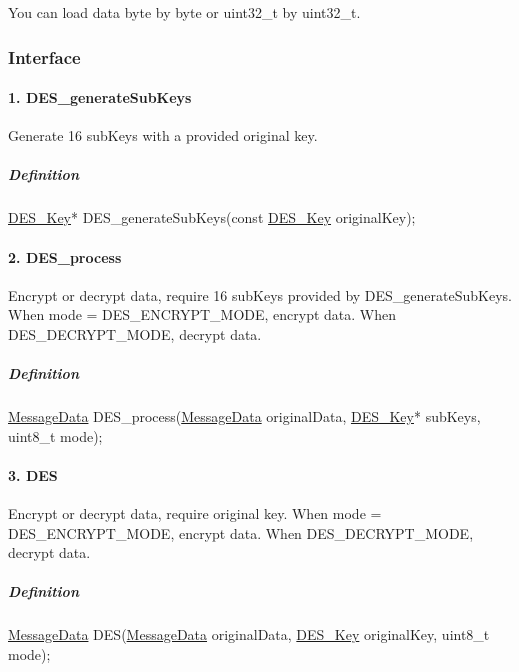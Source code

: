 You can load data byte by byte or uint32\+\_\+t by uint32\+\_\+t.

\subsubsection*{Interface}

\paragraph*{1. D\+E\+S\+\_\+generate\+Sub\+Keys}

Generate 16 sub\+Keys with a provided original key.

\subparagraph*{Definition}


\begin{DoxyCode}
\mbox{\hyperlink{a00134}{DES\_Key}}* DES\_generateSubKeys(\textcolor{keyword}{const} \mbox{\hyperlink{a00134}{DES\_Key}} originalKey);
\end{DoxyCode}


\paragraph*{2. D\+E\+S\+\_\+process}

Encrypt or decrypt data, require 16 sub\+Keys provided by D\+E\+S\+\_\+generate\+Sub\+Keys. When mode = D\+E\+S\+\_\+\+E\+N\+C\+R\+Y\+P\+T\+\_\+\+M\+O\+DE, encrypt data. When D\+E\+S\+\_\+\+D\+E\+C\+R\+Y\+P\+T\+\_\+\+M\+O\+DE, decrypt data.

\subparagraph*{Definition}


\begin{DoxyCode}
\mbox{\hyperlink{a00138}{MessageData}} DES\_process(\mbox{\hyperlink{a00138}{MessageData}} originalData, \mbox{\hyperlink{a00134}{DES\_Key}}* subKeys, uint8\_t 
      mode);
\end{DoxyCode}


\paragraph*{3. D\+ES}

Encrypt or decrypt data, require original key. When mode = D\+E\+S\+\_\+\+E\+N\+C\+R\+Y\+P\+T\+\_\+\+M\+O\+DE, encrypt data. When D\+E\+S\+\_\+\+D\+E\+C\+R\+Y\+P\+T\+\_\+\+M\+O\+DE, decrypt data.

\subparagraph*{Definition}


\begin{DoxyCode}
\mbox{\hyperlink{a00138}{MessageData}} DES(\mbox{\hyperlink{a00138}{MessageData}} originalData, \mbox{\hyperlink{a00134}{DES\_Key}} originalKey, uint8\_t mode);
\end{DoxyCode}


